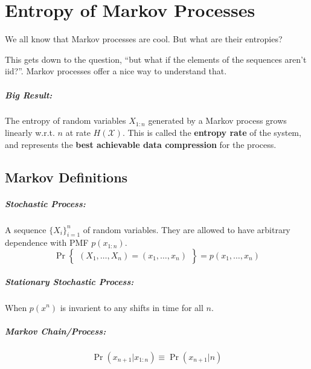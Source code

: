 \documentclass[a4paper,12pt]{report}
\begin{document}
\chapter{Entropy of Markov Processes}

We all know that Markov processes are cool. But what are their entropies? 

This gets down to the question, ``but what if the elements of the sequences
aren't iid?''. Markov processes offer a nice way to understand that. 

\paragraph{Big Result: } The entropy of random variables $X_{1:n}$ generated by
a Markov process grows linearly w.r.t. $n$ at rate $H(\mathcal X)$. This is
called the \textbf{entropy rate} of the system, and represents the \textbf{best
achievable data compression} for the process. 


\section{Markov Definitions} 

\paragraph{Stochastic Process: } A sequence $\{X_i\}_{i=1}^n$ of random
variables. They are allowed to have arbitrary dependence with PMF $p(x_{1:n})$.
\begin{equation}
	\Pr \begin{Bmatrix}
		\left(X_1, \dots, X_n \right)
		 = 
		 (x_1, \dots, x_n)
	\end{Bmatrix}
	 = 
	 p(x_1, \dots, x_n)
\end{equation}

\paragraph{Stationary Stochastic Process: } When $p(x^n)$ is invarient to any 
shifts in time for all $n$.


\paragraph{Markov Chain/Process: } 
\begin{equation}
	\Pr(x_{n+1} | x_{1:n}) \equiv \Pr(x_{n+1} | n)
\end{equation}
\end{document}

